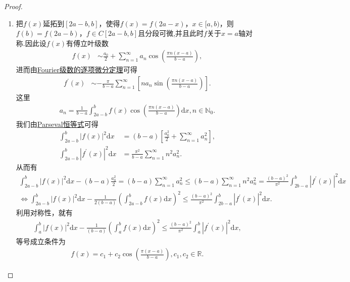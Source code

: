 \documentclass[../../main.tex]{subfiles}
\begin{document}
\begin{proof}
\begin{enumerate}[(1)]
\item 把$f(x)$延拓到$[2a - b,b]$，使得$f(x)=f(2a - x)$，$x\in[a,b)$，则$f(b)=f(2a - b)$，$f\in C[2a - b,b]$且分段可微,并且此时$f$关于$x=a$轴对称.因此设$f(x)$有傅立叶级数
\begin{align*}
f(x) &\sim \frac{a_0}{2}+\sum_{n = 1}^{\infty}a_n\cos\left(\frac{\pi n(x - a)}{b - a}\right),
\end{align*}
进而由\hyperref[theorem:Fourier级数的逐项微分定理]{Fourier级数的逐项微分定理}可得
\begin{align*}
f^{\prime}(x) &\sim -\frac{\pi}{b - a}\sum_{n = 1}^{\infty}[na_n\sin\left(\frac{\pi n(x - a)}{b - a}\right)].
\end{align*}
这里
\begin{align*}
a_n=\frac{1}{b - a}\int_{2a - b}^{b}f(x)\cos\left(\frac{\pi n(x - a)}{b - a}\right)\mathrm{d}x, n\in\mathbb{N}_0.
\end{align*}
我们由\hyperref[theorem:Parseval恒等式]{Parseval恒等式}可得
\begin{align*}
\int_{2a - b}^{b}|f(x)|^2\mathrm{d}x&=(b - a)\left[\frac{a_0^2}{2}+\sum_{n = 1}^{\infty}a_n^2\right],\\
\int_{2a - b}^{b}|f^{\prime}(x)|^2\mathrm{d}x&=\frac{\pi^2}{b - a}\sum_{n = 1}^{\infty}n^2a_n^2.
\end{align*}
从而有
\begin{gather*}
\int_{2a-b}^b{|f(x)|^2\mathrm{d}x}-\left( b-a \right) \frac{a_{0}^{2}}{2}=\left( b-a \right) \sum_{n=1}^{\infty}{a_{n}^{2}}\leqslant \left( b-a \right) \sum_{n=1}^{\infty}{n^2a_{n}^{2}}=\frac{(b-a)^2}{\pi ^2}\int_{2b-a}^b{|f^{\prime}(x)|^2\mathrm{d}x}
\\
\iff \int_{2a-b}^b{|f(x)|^2\mathrm{d}x}-\frac{1}{2(b-a)}\left( \int_{2a-b}^b{f(x)\mathrm{d}x} \right) ^2\le \frac{(b-a)^2}{\pi ^2}\int_{2b-a}^b{|f^{\prime}(x)|^2\mathrm{d}x}.
\end{gather*}
利用对称性，就有
\begin{align*}
\int_{a}^{b}|f(x)|^2\mathrm{d}x-\frac{1}{(b - a)}\left(\int_{a}^{b}f(x)\mathrm{d}x\right)^2\leqslant \frac{(b - a)^2}{\pi^2}\int_{a}^{b}|f^{\prime}(x)|^2\mathrm{d}x,
\end{align*}
等号成立条件为
\begin{align*}
f(x)=c_1 + c_2\cos\left(\frac{\pi(x - a)}{b - a}\right), c_1,c_2\in\mathbb{R}.
\end{align*}


\end{enumerate}
\end{proof}
\end{document}
